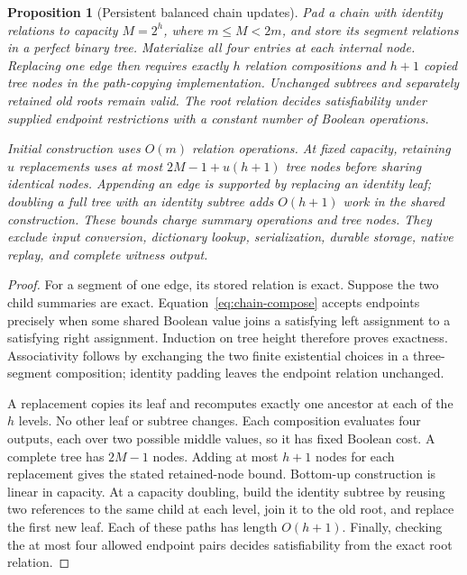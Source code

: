 \documentclass[11pt,a4paper]{article}
\numberwithin{equation}{section}
\theoremstyle{plain}
\newtheorem{proposition}[lemma]{Proposition}
\theoremstyle{definition}
\theoremstyle{remark}
\begin{document}
\begin{proposition}[Persistent balanced chain updates]
\label{prop:balanced-chain}
Pad a chain with identity relations to capacity $M=2^h$, where $m\leq M<2m$, and store its segment relations in a perfect binary tree. Materialize all four entries at each internal node. Replacing one edge then requires exactly $h$ relation compositions and $h+1$ copied tree nodes in the path-copying implementation. Unchanged subtrees and separately retained old roots remain valid. The root relation decides satisfiability under supplied endpoint restrictions with a constant number of Boolean operations.

Initial construction uses $O(m)$ relation operations. At fixed capacity, retaining $u$ replacements uses at most $2M-1+u(h+1)$ tree nodes before sharing identical nodes. Appending an edge is supported by replacing an identity leaf; doubling a full tree with an identity subtree adds $O(h+1)$ work in the shared construction. These bounds charge summary operations and tree nodes. They exclude input conversion, dictionary lookup, serialization, durable storage, native replay, and complete witness output.
\end{proposition}

\begin{proof}
For a segment of one edge, its stored relation is exact. Suppose the two child summaries are exact. Equation~\eqref{eq:chain-compose} accepts endpoints precisely when some shared Boolean value joins a satisfying left assignment to a satisfying right assignment. Induction on tree height therefore proves exactness. Associativity follows by exchanging the two finite existential choices in a three-segment composition; identity padding leaves the endpoint relation unchanged.

A replacement copies its leaf and recomputes exactly one ancestor at each of the $h$ levels. No other leaf or subtree changes. Each composition evaluates four outputs, each over two possible middle values, so it has fixed Boolean cost. A complete tree has $2M-1$ nodes. Adding at most $h+1$ nodes for each replacement gives the stated retained-node bound. Bottom-up construction is linear in capacity. At a capacity doubling, build the identity subtree by reusing two references to the same child at each level, join it to the old root, and replace the first new leaf. Each of these paths has length $O(h+1)$. Finally, checking the at most four allowed endpoint pairs decides satisfiability from the exact root relation.
\end{proof}
\end{document}

